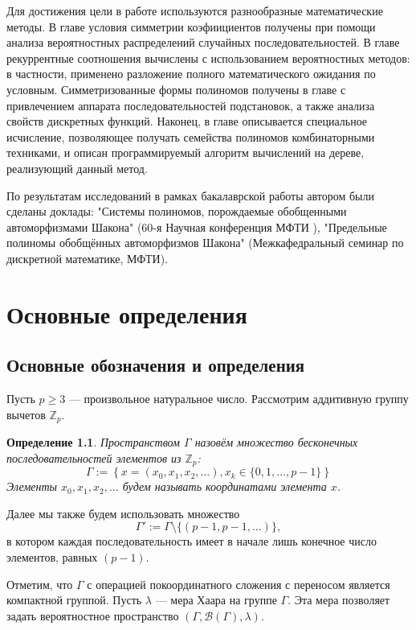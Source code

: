 \documentclass[14pt, a4paper, russian]{report}
\newtheorem{definition}{\indent Определение}
\begin{document}
Для достижения цели в работе используются разнообразные математические методы. В главе условия симметрии коэфиициентов получены при помощи анализа вероятностных распределений случайных последовательностей. В главе рекуррентные соотношения вычислены с использованием вероятностных методов: в частности, применено разложение полного математического ожидания по условным. Симметризованные формы полиномов получены в главе с привлечением аппарата последовательностей подстановок, а также анализа свойств дискретных функций. Наконец, в главе описывается специальное исчисление, позволяющее получать семейства полиномов комбинаторными техниками, и описан программируемый алгоритм вычислений на дереве, реализующий данный метод.

По результатам исследований в рамках бакалаврской работы автором были сделаны доклады: "Системы полиномов, 
порождаемые обобщенными автоморфизмами Шакона" (60-я Научная конференция МФТИ \cite{mipt60}), "Предельные полиномы обобщённых автоморфизмов Шакона" (Межкафедральный семинар по дискретной математике, МФТИ).



\chapter{Основные определения}

\section{Основные обозначения и определения}

Пусть $p \ge 3$ --- произвольное натуральное число. Рассмотрим аддитивную группу вычетов $\mathbb{Z}_p$. 

\begin{definition}
Пространством $\Gamma$ назовём множество бесконечных последовательностей элементов из $\mathbb{Z}_p$:
$$\Gamma := \left\{x = \left(x_0, x_1, x_2, \ldots \right), x_k \in \{0, 1, \ldots, p - 1\} \right\}$$
Элементы $x_0, x_1, x_2, \ldots$ будем называть координатами элемента $x$.
\end{definition}
Далее мы также будем использовать множество 
$$\Gamma' := \Gamma \setminus \{(p-1,p-1,\ldots)\},$$
в котором каждая последовательность имеет в начале лишь конечное число элементов, равных $(p-1)$.

Отметим, что $\Gamma$ с операцией покоординатного сложения с переносом является компактной группой. Пусть $\lambda$ --- мера Хаара на группе $\Gamma$. Эта мера позволяет задать вероятностное пространство $(\Gamma, \mathcal{B}(\Gamma), \lambda)$.
\end{document}
